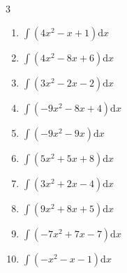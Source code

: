 \begin{multicols}{3}
\begin{enumerate}

\columnbreak %

  \item $\displaystyle \int \left( 4x^{2}-x+1 \right) \mathrm{d}x$


  \item $\displaystyle \int \left( 4x^{2}-8x+6 \right) \mathrm{d}x$


  \item $\displaystyle \int \left( 3x^{2}-2x-2 \right) \mathrm{d}x$


  \item $\displaystyle \int \left( -9x^{2}-8x+4 \right) \mathrm{d}x$


  \item $\displaystyle \int \left( -9x^{2}-9x \right) \mathrm{d}x$


  \item $\displaystyle \int \left( 5x^{2}+5x+8 \right) \mathrm{d}x$


  \item $\displaystyle \int \left( 3x^{2}+2x-4 \right) \mathrm{d}x$


  \item $\displaystyle \int \left( 9x^{2}+8x+5 \right) \mathrm{d}x$


  \item $\displaystyle \int \left( -7x^{2}+7x-7 \right) \mathrm{d}x$


  \item $\displaystyle \int \left( -x^{2}-x-1 \right) \mathrm{d}x$


\end{enumerate}
\end{multicols}
